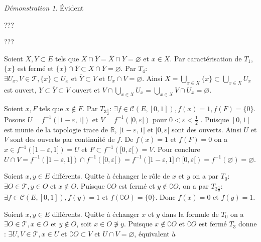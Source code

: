 \documentclass[a4paper, 11pt, french]{book}
\newenvironment{itemise}{\itemize}{\enditemize}
\theoremstyle{plain} %
\theoremstyle{definition} %
\theoremstyle{remark} %
\newtheorem*{demonstration}{Démonstration}
\newcommand{\1}{\mathds{1}}
\newcommand\vide{\varnothing}
\newcommand{\inv}[1]{#1^{-1}}
\newcommand\et{\text{ et }}
\newcommand{\R}{\mathbb{R}}
\renewcommand{\cal}[1]{\mathcal{#1}}
\newcommand{\scr}[1]{\mathscr{#1}}
\begin{document}
\begin{demonstration}
	\begin{itemise}
		\item[$T_5\Rightarrow T_4$ et $T_{2\frac{1}{2}}\Rightarrow T_2\Rightarrow T_1\Rightarrow T_0$:] Évident
		\item[$T_1+T_4\Rightarrow T_{3\frac{1}{2}}$:] {\color{green} ???}
		\item[$T_3+T_4\Rightarrow T_{3\frac{1}{2}}$:] {\color{green} ???}
			{\color{red}
				\item[$T_1+T_4\Rightarrow T_5$:] Soient $X, Y\subset E$ tels que $X\cap\overline{Y}=\overline{X}\cap Y=\vide$ et $x\in X$.
				Par caractérisation de $T_1$, $\{x\}$ est fermé et $\{x\}\cap\overline{Y}\subset X\cap\overline{Y}=\vide$.
				Par $T_4$: $\exists U_x, V\in\scr{T}, \{x\}\subset U_x\et\overline{Y}\subset V\et U_x\cap V=\vide$.
				Ainsi $X=\bigcup_{x\in X}\{x\}\subset\bigcup_{x\in X}U_x$ est ouvert, $Y\subset\overline{Y}\subset V$ ouvert et $V\cap\bigcup_{x\in X}U_x=\bigcup_{x\in X}V\cap U_x=\vide$.
			}
		\item[$T_{3\frac{1}{2}}\Rightarrow T_3$:] Soient $x, F$ tels que $x\notin F$.
		Par $T_{3\frac{1}{2}}$: $\exists f\in\cal{C}(E, [0, 1]), f(x)=1, f(F)=\{0\}$.
		Posons $U=\inv{f}(]1-\varepsilon, 1])$ et $V=\inv{f}([0, \varepsilon[)$ pour $0<\varepsilon<\frac{1}{2}$ .
		Puisque $[0, 1]$ est munie de la topologie trace de $\R$, $]1-\varepsilon, 1]$ et $[0, \varepsilon[$ sont des ouverts.
		Ainsi $U$ et $V$ sont des ouverts par continuité de $f$.
		De $f(x)=1$ et $f(F)=0$ on a $x\in\inv{f}(]1-\varepsilon, 1])=U$ et $F\subset\inv{f}([0, \varepsilon[)=V$.
		Pour conclure $U\cap V=\inv{f}(]1-\varepsilon, 1])\cap\inv{f}([0, \varepsilon[)=\inv{f}(]1-\varepsilon, 1]\cap[0, \varepsilon[)=\inv{f}(\vide)=\vide$.
		\item[$T_0+T_{3\frac{1}{2}}\Rightarrow T_{2\frac{3}{4}}$:] Soient $x, y\in E$ différents.
		Quitte à échanger le rôle de $x$ et $y$ on a par $T_0$: $\exists O\in\scr{T}, y\in O\et x\notin O$.
		Puisque $\complement O$ est fermé et $y\notin\complement O$, on a par $T_{3\frac{1}{2}}$: $\exists f\in\cal{C}(E, [0, 1]), f(y)=1\et f(\complement O)=\{0\}$.
		Donc $f(x)=0$ et $f(y)=1$.
		\item[$T_0+T_3\Rightarrow T_{2\frac{1}{2}}$:] Soient $x, y\in E$ différents.
		Quitte à échanger $x$ et $y$ dans la formule de $T_0$ on a $\exists O\in\scr{T}, x\in O\et y\notin O$, soit $x\in O\not\ni y$.
		Puisque $x\notin\complement O$ et $\complement O$ est fermé $T_3$ donne :
		$\exists U, V\in\scr{T}, x\in U\et\complement O\subset V\et U\cap V=\vide$, équivalent à

\end{itemise}
\end{demonstration}
\end{document}

